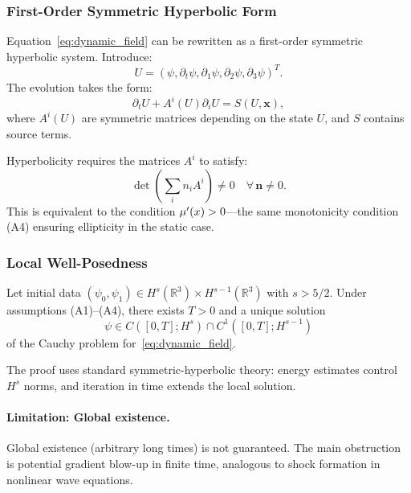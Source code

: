 \subsubsection{First-Order Symmetric Hyperbolic Form}

Equation~\eqref{eq:dynamic_field} can be rewritten as a first-order 
symmetric hyperbolic system. Introduce:
\begin{equation}
U = (\psi, \partial_t\psi, \partial_1\psi, \partial_2\psi, \partial_3\psi)^T.
\end{equation}
The evolution takes the form:
\begin{equation}
\partial_t U + A^i(U)\partial_i U = S(U, \mathbf{x}),
\label{eq:first_order_system}
\end{equation}
where $A^i(U)$ are symmetric matrices depending on the state $U$, and 
$S$ contains source terms.

Hyperbolicity requires the matrices $A^i$ to satisfy:
\begin{equation}
\det\!\left(\sum_i n_i A^i\right) \neq 0 \quad \forall\,\mathbf{n} \neq 0.
\end{equation}
This is equivalent to the condition $\mu'(x) > 0$---the same 
monotonicity condition (A4) ensuring ellipticity in the static case.

\subsubsection{Local Well-Posedness}

\begin{theorem}\label{thm:local_cauchy}
Let initial data $(\psi_0, \psi_1) \in H^s(\mathbb{R}^3) \times H^{s-1}(\mathbb{R}^3)$ 
with $s > 5/2$. Under assumptions (A1)--(A4), there exists $T > 0$ and a 
unique solution
\begin{equation}
\psi \in C([0,T]; H^s) \cap C^1([0,T]; H^{s-1})
\end{equation}
of the Cauchy problem for~\eqref{eq:dynamic_field}.
\end{theorem}

The proof uses standard symmetric-hyperbolic theory: energy estimates 
control $H^s$ norms, and iteration in time extends the local solution.

\paragraph{Limitation: Global existence.}
Global existence (arbitrary long times) is not guaranteed. The main 
obstruction is potential gradient blow-up in finite time, analogous to 
shock formation in nonlinear wave equations.


